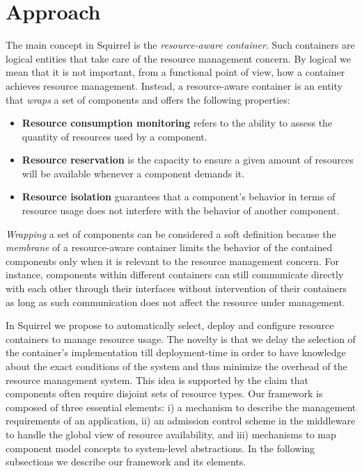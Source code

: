 \section{Approach} \label{sec:apprach}

The main concept in Squirrel is the \textit{resource-aware container}.
Such containers are logical entities that take care of the resource management concern.
By logical we mean that it is not important, from a functional point of view, how a
container achieves resource management. 
Instead, a resource-aware container is an entity that \textit{wraps} a set of components and offers the following properties:
\begin{itemize}
\item \textbf{Resource consumption monitoring} refers to the ability to assess the 
quantity of resources used by a component.
\item \textbf{Resource reservation} is the capacity to ensure a given amount of
resources will be available whenever a component demands it.
\item \textbf{Resource isolation} guarantees that a component's behavior in terms
of resource usage does not interfere with the behavior of another component.
\end{itemize} 

\textit{Wrapping} a set of components can be considered a soft definition because the \textit{membrane} of a resource-aware container limits the behavior
of the contained components only when it is relevant to the resource management concern.
For instance, components within different containers can still communicate directly
with each other through their interfaces without intervention of their containers as long as such communication does not affect the resource under management.  

In Squirrel we propose to automatically select, deploy and configure resource containers to manage resource usage.
The novelty is that we delay the selection of the container's implementation till deployment-time in order to have knowledge about the exact conditions of the system and thus minimize the overhead of the resource management system.
This idea is supported by the claim that components often require disjoint sets of resource types.
Our framework is composed of three essential elements: i) a mechanism to describe the management requirements of an application, ii) an admission control scheme in the middleware to handle the global view of resource availability, and iii) mechanisms to map component model concepts to system-level abstractions.
In the following subsections we describe our framework and its elements.

